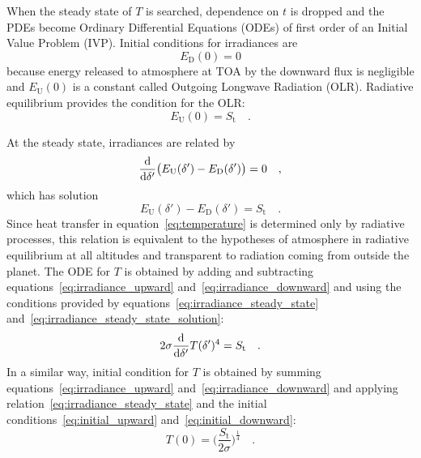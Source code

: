 \documentclass[a4paper,10pt,twocolumn,\classoptions]{article}
\begin{document}
When the steady state of $T$ is searched, dependence on $t$ is dropped and the PDEs become Ordinary Differential Equations (ODEs) of first order of an Initial Value Problem (IVP).
Initial conditions for irradiances are
\begin{equation}
  \label{eq:initial_downward}
  E_\text{D}(0) = 0
\end{equation}
because energy released to atmosphere at TOA by the downward flux is negligible and $E_\text{U}(0)$ is a constant called Outgoing Longwave Radiation (OLR).
Radiative equilibrium provides the condition for the OLR:
\begin{equation}
  \label{eq:initial_upward}
  E_\text{U}(0) = S_\text{t}
  \quad .
\end{equation}

At the steady state, irradiances are related by
\begin{equation}
  \label{eq:irradiance_steady_state}
  \odv*{\big( E_\text{U}(\delta') - E_\text{D}(\delta') \big)}{\delta'} = 0
  \quad ,
\end{equation}
which has solution
\begin{equation}
  \label{eq:irradiance_steady_state_solution}
  E_\text{U}(\delta') - E_\text{D}(\delta') = S_\text{t}
  \quad .
\end{equation}
Since heat transfer in equation~\eqref{eq:temperature} is determined only by radiative processes, this relation is equivalent to the hypotheses of atmosphere in radiative equilibrium at all altitudes and transparent to radiation coming from outside the planet.
The ODE for $T$ is obtained by adding and subtracting equations~\eqref{eq:irradiance_upward} and~\eqref{eq:irradiance_downward} and using the conditions provided by equations~\eqref{eq:irradiance_steady_state} and~\eqref{eq:irradiance_steady_state_solution}:
\begin{equation}
  \label{eq:temperature_analytical}
  2 \sigma \odv*{T(\delta')^4}{\delta'} = S_\text{t}
  \quad .
\end{equation}
In a similar way, initial condition for $T$ is obtained by summing equations~\eqref{eq:irradiance_upward} and~\eqref{eq:irradiance_downward} and applying relation~\eqref{eq:irradiance_steady_state} and the initial conditions~\eqref{eq:initial_upward} and~\eqref{eq:initial_downward}:
\begin{equation}
  \label{eq:initial_temperature}
  T(0) = \bigg( \frac{S_\text{t}}{2 \sigma} \bigg)^\frac{1}{4}
  \quad .
\end{equation}
\end{document}

